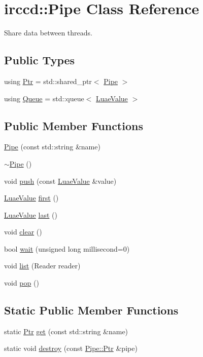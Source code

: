 \hypertarget{a00050}{\section{irccd\-:\-:Pipe Class Reference}
\label{a00050}
}


Share data between threads.  


\subsection*{Public Types}
\begin{DoxyCompactItemize}
\item 
using \hyperlink{a00050_a66a1128688eb94d300940ebc1cc43910}{Ptr} = std\-::shared\-\_\-ptr$<$ \hyperlink{a00050}{Pipe} $>$
\item 
using \hyperlink{a00050_a00554e1a82ed959f846ebcd4dbdd9a8a}{Queue} = std\-::queue$<$ \hyperlink{a00045}{Luae\-Value} $>$
\end{DoxyCompactItemize}
\subsection*{Public Member Functions}
\begin{DoxyCompactItemize}
\item 
\hyperlink{a00050_a83a682ac3c1980f2285c191800ae5c68}{Pipe} (const std\-::string \&name)
\item 
\hyperlink{a00050_a6cacb7512d32011cd8613e91182de729}{$\sim$\-Pipe} ()
\item 
void \hyperlink{a00050_a7d673129e36e6894434d6e5a782f05ac}{push} (const \hyperlink{a00045}{Luae\-Value} \&value)
\item 
\hyperlink{a00045}{Luae\-Value} \hyperlink{a00050_a4cafdbf46fe842544807ad7256c71903}{first} ()
\item 
\hyperlink{a00045}{Luae\-Value} \hyperlink{a00050_a2000b0e0a58faae31abf4d51737882db}{last} ()
\item 
void \hyperlink{a00050_a9cbe1ec09738f2e274a9d7d7033c86f7}{clear} ()
\item 
bool \hyperlink{a00050_afe109f59293daaa51d4962c5efddb267}{wait} (unsigned long millisecond=0)
\item 
void \hyperlink{a00050_a00056d08956ae08bb93b282bd993e79d}{list} (Reader reader)
\item 
void \hyperlink{a00050_ac33eebf87f0a1dd8daf15bbb49540fa5}{pop} ()
\end{DoxyCompactItemize}
\subsection*{Static Public Member Functions}
\begin{DoxyCompactItemize}
\item 
static \hyperlink{a00050_a66a1128688eb94d300940ebc1cc43910}{Ptr} \hyperlink{a00050_a2b21f096d273a1f2caac29b5d69db317}{get} (const std\-::string \&name)
\item 
static void \hyperlink{a00050_a0bceb43b006c8656c8b2eec861df818c}{destroy} (const \hyperlink{a00050_a66a1128688eb94d300940ebc1cc43910}{Pipe\-::\-Ptr} \&pipe)
\end{DoxyCompactItemize}


